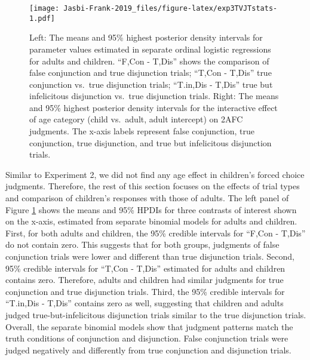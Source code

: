 \documentclass[,man,floatsintext]{apa6}
\begin{document}
\begin{figure}
\centering
\texttt{[image: Jasbi-Frank-2019\_files/figure-latex/exp3TVJTstats-1.pdf]}
\caption{\label{fig:exp3TVJTstats}Left: The means and 95\% highest posterior density intervals for parameter values estimated in separate ordinal logistic regressions for adults and children. \enquote{F,Con - T,Dis} shows the comparison of false conjunction and true disjunction trials; \enquote{T,Con - T,Dis} true conjunction vs.~true disjunction trials; \enquote{T.in,Dis - T,Dis} true but infelicitous disjunction vs.~true disjunction trials. Right: The means and 95\% highest posterior density intervals for the interactive effect of age category (child vs.~adult, adult intercept) on 2AFC judgments. The x-axis labels represent false conjunction, true conjunction, true disjunction, and true but infelicitous disjunction trials.}
\end{figure}

Similar to Experiment 2, we did not find any age effect in children's forced choice judgments. Therefore, the rest of this section focuses on the effects of trial types and comparison of children's responses with those of adults. The left panel of Figure \ref{fig:exp3TVJTstats} shows the means and 95\% HPDIs for three contrasts of interest shown on the x-axis, estimated from separate binomial models for adults and children. First, for both adults and children, the 95\% credible intervals for \enquote{F,Con - T,Dis} do not contain zero. This suggests that for both groups, judgments of false conjunction trials were lower and different than true disjunction trials. Second, 95\% credible intervals for \enquote{T,Con - T,Dis} estimated for adults and children contains zero. Therefore, adults and children had similar judgments for true conjunction and true disjunction trials. Third, the 95\% credible intervals for \enquote{T.in,Dis - T,Dis} contains zero as well, suggesting that children and adults judged true-but-infelicitous disjunction trials similar to the true disjunction trials. Overall, the separate binomial models show that judgment patterns match the truth conditions of conjunction and disjunction. False conjunction trials were judged negatively and differently from true conjunction and disjunction trials.
\end{document}
